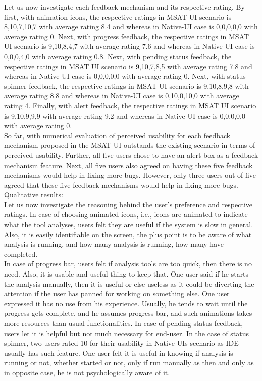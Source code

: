 Let us now investigate each feedback mechanism and its respective rating. By first, with animation icons, the respective ratings in MSAT UI scenario is 8,10,7,10,7 with average rating 8.4 and whereas in Native-UI case is 0,0,0,0,0 with average rating 0. Next, with progress feedback, the respective ratings in MSAT UI scenario is 9,10,8,4,7 with average rating 7.6 and whereas in Native-UI case is 0,0,0,4,0 with average rating 0.8. Next, with pending status feedback, the respective ratings in MSAT UI scenario is 9,10,7,8,5 with average rating 7.8 and whereas in Native-UI case is 0,0,0,0,0 with average rating 0. Next, with status spinner feedback, the respective ratings in MSAT UI scenario is 9,10,8,9,8 with average rating 8.8 and whereas in Native-UI case is 0,10,0,10,0 with average rating 4. Finally, with alert feedback, the respective ratings in MSAT UI scenario is 9,10,9,9,9 with average rating 9.2 and whereas in Native-UI case is 0,0,0,0,0 with average rating 0. \\

So far, with numerical evaluation of perceived usability for each feedback mechanism proposed in the MSAT-UI outstands the existing scenario in terms of perceived usability. 
Further, all five users chose to have an alert box as a feedback mechanism feature. Next, all five users also agreed on having these five feedback mechanisms would help in fixing more bugs. However, only three users out of five agreed that these five feedback mechanisms would help in fixing more bugs. \\

Qualitative results: \\

Let us now investigate the reasoning behind the user’s preference and respective ratings. In case of choosing animated icons, i.e., icons are animated to indicate what the tool analyses, users felt they are useful if the system is slow in general. Also, it is easily identifiable on the screen, the plus point is to be aware of what analysis is running, and how many analysis is running, how many have completed. \\

In case of progress bar, users felt if analysis tools are too quick, then there is no need. Also, it is usable and useful thing to keep that. One user said if he starts the analysis manually, then it is useful or else useless as it could be diverting the attention if the user has panned for working on something else. One user expressed it has no use from his experience. Usually, he tends to wait until the progress gets complete, and he assumes progress bar, and such animations takes more resources than usual functionalities. In case of pending status feedback, users let it is helpful but not much necessary for end-user. In the case of status spinner, two users rated 10 for their usability in Native-UIs scenario as IDE usually has such feature. One user felt it is useful in knowing if analysis is running or not, whether started or not, only if run manually as then and only as in opposite case, he is not psychologically aware of it. \\

